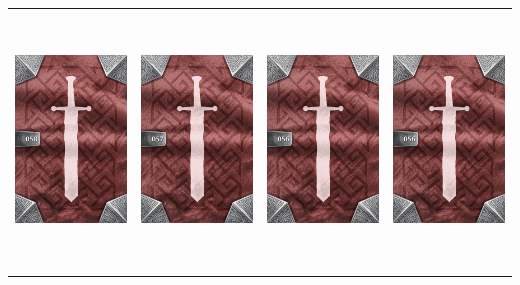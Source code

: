 \documentclass{minimal}
\begin{document}
{\begin{longtable}{llll}
\includegraphics[width=44mm,height=68mm]{./57-63/gh-058-cloak-of-phasing-back.png} &
\includegraphics[width=44mm,height=68mm]{./57-63/gh-057-serene-sandals-back.png} &
\includegraphics[width=44mm,height=68mm]{./50-56/gh-056-ring-of-brutality-back.png} &
\includegraphics[width=44mm,height=68mm]{./50-56/gh-056-ring-of-brutality-back.png}\\ 

\end{longtable}}
\end{document}
